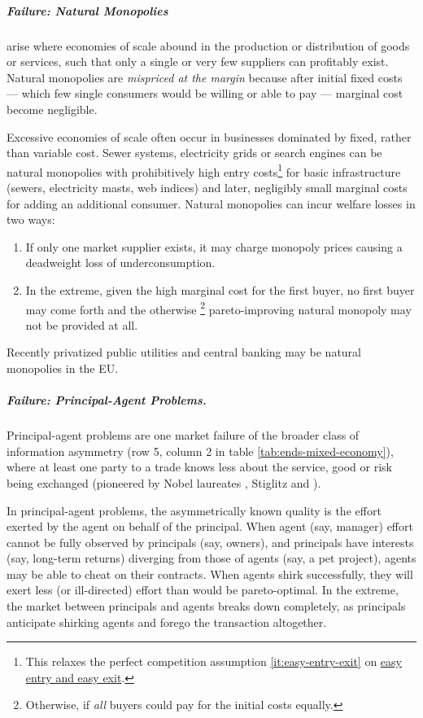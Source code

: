 \subparagraph{Failure: Natural Monopolies}  \label{sec:natural-monopoly} arise where economies of scale abound in the production or distribution of goods or services, such that only a single or very few suppliers can profitably exist. Natural monopolies are \emph{mispriced at the margin} because after initial fixed costs --- which few single consumers would be willing or able to pay --- marginal cost become negligible.

Excessive economies of scale often occur in businesses dominated by fixed, rather than variable cost. Sewer systems, electricity grids or search engines can be natural monopolies with prohibitively high entry costs\footnote{
	This relaxes the perfect competition assumption \ref{it:easy-entry-exit} on \hyperref[it:easy-entry-exit]{easy entry and easy exit}.}
for basic infrastructure (sewers, electricity masts, web indices) and later, negligibly small marginal costs for adding an additional consumer.  Natural monopolies can incur welfare losses in two ways:
\begin{enumerate}
	\item If only one market supplier exists, it may charge monopoly prices causing a deadweight loss of underconsumption.
	\item In the extreme, given the high marginal cost for the first buyer, no first buyer may come forth and the otherwise
\footnote{
	Otherwise, if \emph{all} buyers could pay for the initial costs equally.
} pareto-improving natural monopoly may not be provided at all.
\end{enumerate}
Recently privatized public utilities and central banking may be natural monopolies in the \gls{EU}.

\subparagraph[Failure: Principal-Agent Problems]{Failure: Principal-Agent Problems.} \label{sec:principal-agent-problem}
Principal-agent problems are one market failure of the broader class of information asymmetry (row 5, column 2 in table \ref{tab:ends-mixed-economy}), where at least one party to a trade knows less about the service, good or risk being exchanged (pioneered by Nobel laureates \citealt{Akerlof-1970-aa}, Stiglitz \citeyear{Stiglitz1976} and \citealt{Spence1974}).

In principal-agent problems, the asymmetrically known quality is the effort exerted by the agent on behalf of the principal. When agent (say, manager) effort cannot be fully observed by principals (say, owners), and principals have interests (say, long-term returns) diverging from those of agents (say, a pet project), agents may be able to cheat on their contracts. When agents shirk successfully, they will exert less (or ill-directed) effort than would be pareto-optimal. In the extreme, the market between principals and agents breaks down completely, as principals anticipate shirking agents and forego the transaction altogether.

